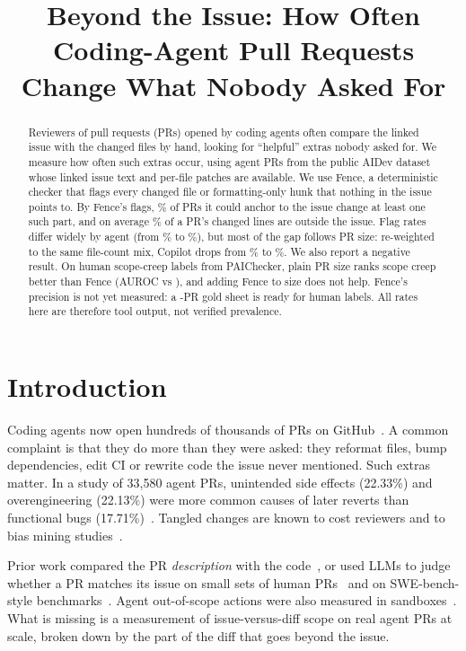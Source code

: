 \documentclass[10pt,conference]{IEEEtran}
\begin{document}
\title{Beyond the Issue: How Often Coding-Agent Pull Requests\\Change What Nobody Asked For}
\author{}
\maketitle

\begin{abstract}\normalfont
Reviewers of pull requests (PRs) opened by coding agents often compare the linked issue with the changed files by hand, looking for ``helpful'' extras nobody asked for. We measure how often such extras occur, using \nCorpus{} agent PRs from the public AIDev dataset whose linked issue text and per-file patches are available. We use Fence, a deterministic checker that flags every changed file or formatting-only hunk that nothing in the issue points to. By Fence's flags, \pctReach\% of PRs it could anchor to the issue change at least one such part, and on average \meanReach\% of a PR's changed lines are outside the issue. Flag rates differ widely by agent (from \reachJules\% to \reachCopilot\%), but most of the gap follows PR size: re-weighted to the same file-count mix, Copilot drops from \reachCopilot\% to \stdCopilot\%. We also report a negative result. On \nPai{} human scope-creep labels from PAIChecker, plain PR size ranks scope creep better than Fence (AUROC \aucSize{} vs \aucFence), and adding Fence to size does not help. Fence's precision is not yet measured: a \goldPRs-PR gold sheet is ready for human labels. All rates here are therefore tool output, not verified prevalence.
\end{abstract}

\section{Introduction}
Coding agents now open hundreds of thousands of PRs on GitHub~\cite{li2026aidev}. A common complaint is that they do more than they were asked: they reformat files, bump dependencies, edit CI or rewrite code the issue never mentioned. Such extras matter. In a study of 33{,}580 agent PRs, unintended side effects (22.33\%) and overengineering (22.13\%) were more common causes of later reverts than functional bugs (17.71\%)~\cite{oukhay2026revert}. Tangled changes are known to cost reviewers and to bias mining studies~\cite{herzig2013tangled}.

Prior work compared the PR \emph{description} with the code~\cite{gong2026prmci}, or used LLMs to judge whether a PR matches its issue on small sets of human PRs~\cite{isik2025forge,altunhan2026finetune} and on SWE-bench-style benchmarks~\cite{wang2026paichecker}. Agent out-of-scope actions were also measured in sandboxes~\cite{qu2026overeager,trong2026swemisbehavior}. What is missing is a measurement of issue-versus-diff scope on real agent PRs at scale, broken down by the part of the diff that goes beyond the issue.
\end{document}
